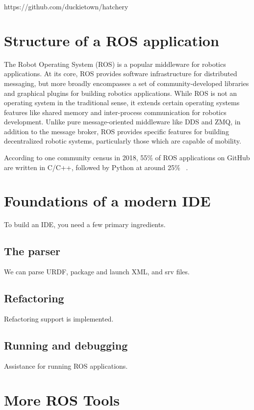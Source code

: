 \documentclass[12pt,initial,twoside,maitrise]{dms}
\numberwithin{equation}{section}
\numberwithin{table}{chapter}
\numberwithin{figure}{chapter}
\begin{document}
https://github.com/duckietown/hatchery

\section{Structure of a ROS application}

The Robot Operating System (ROS) is a popular middleware for robotics applications. At its core, ROS provides software infrastructure for distributed messaging, but more broadly encompasses a set of community-developed libraries and graphical plugins for building robotics applications. While ROS is not an operating system in the traditional sense, it extends certain operating systems features like shared memory and inter-process communication for robotics development. Unlike pure message-oriented middleware like DDS and ZMQ, in addition to the message broker, ROS provides specific features for building decentralized robotic systems, particularly those which are capable of mobility.

According to one community census in 2018, 55\% of ROS applications on GitHub are written in C/C++, followed by Python at around 25\% ~\cite{Areserio54:online}.

\section{Foundations of a modern IDE}

To build an IDE, you need a few primary ingredients.

\subsection{The parser}

We can parse URDF, package and launch XML, and srv files.

\subsection{Refactoring}

Refactoring support is implemented.

\subsection{Running and debugging}

Assistance for running ROS applications.

\section{More ROS Tools}
\end{document}
